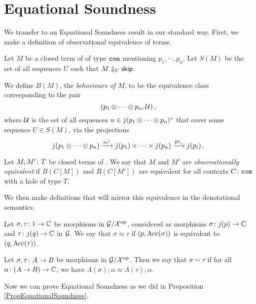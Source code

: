 \documentclass{report}[11pt]
\begin{document}
\section{Equational Soundness}

We transfer to an Equational Soundness result in our standard way.
First, we make a definition of observational equivalence of \IAXX terms.

\begin{definition}
  Let $M$ be a closed term of \IAXX of type ${\mathtt{com}}$ mentioning $p_1,\cdots,p_n$.
  Let $S(M)$ be the set of all sequences $U$ such that $M\Downarrow_U{\mathsf{skip}}$.

  We define $B(M)$, the \emph{behaviours of $M$}, to be the equivalence class corresponding to the pair
  \[
    (p_1\otimes \cdots \otimes p_n, \mathcal U)\,,
    \]
  where $\mathcal U$ is the set of all sequences $u\in j(p_1\otimes \cdots \otimes p_n)^*$ that cover some sequence $U\in S(M)$, via the projections
  \[
    j(p_1\otimes \cdots \otimes p_n) \xrightarrow{m^j} j(p_1) \times \cdots \times j(p_n) \xrightarrow{\operatorname{pr}_i} j(p_i)\,.
    \]
\end{definition}

\begin{definition}
  Let $M,M'\colon T$ be closed terms of \IAXX.  
  We say that $M$ and $M'$ are \emph{observationally equivalent} if $B(C[M])$ and $B(C[M'])$ are equivalent for all contexts $C\colon {\mathtt{com}}$ with a hole of type $T$.
\end{definition}

We then make definitions that will mirror this equivalence in the denotational semantics.

\begin{definition}
  Let $\sigma,\tau\colon 1 \to \mathbb{C}$ be morphisms in $\mathcal G/\mathcal X^{\mathrm{op}}$, considered as morphisms $\sigma\colon j(p) \to \mathbb{C}$ and $\tau \colon j(q) \to \mathbb{C}$ in $\mathcal G$.  
  We say that $\sigma\approx\tau$ if $(p,\operatorname{Acc}(\sigma))$ is equivalent to $(q,\operatorname{Acc}(\tau))$.
\end{definition}

\begin{definition}
  Let $\sigma,\tau\colon A \to B$ be morphisms in $\mathcal G/\mathcal X^{\mathrm{op}}$.  
  Then we say that $\sigma\sim\tau$ if for all $\alpha\colon (A\to B) \to \mathbb{C}$, we have $\Lambda(\sigma);\alpha \approx \Lambda(\tau);\alpha$.
\end{definition}

Now we can prove Equational Soundness as we did in Proposition \ref{PropEquationalSoundness}.
\end{document}
